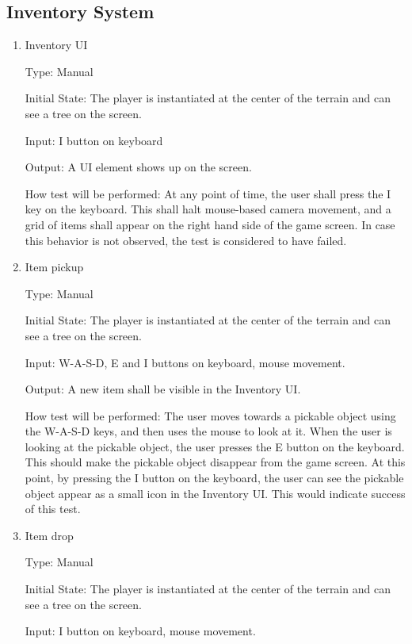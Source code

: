\documentclass[12pt, titlepage]{article}
\begin{document}
\subsection{Inventory System}

\begin{enumerate}
	
\item{Inventory UI\\}

Type: Manual

Initial State: The player is instantiated at the center of the terrain and can see a tree on the screen.

Input: I button on keyboard

Output: A UI element shows up on the screen.

How test will be performed:
At any point of time, the user shall press the I key on the keyboard. This shall halt mouse-based camera movement, and a grid of items shall appear on the right hand side of the game screen. In case this behavior is not observed, the test is considered to have failed.

\item{Item pickup\\}

Type: Manual

Initial State: The player is instantiated at the center of the terrain and can see a tree on the screen.

Input: W-A-S-D, E and I buttons on keyboard, mouse movement.

Output: A new item shall be visible in the Inventory UI.

How test will be performed:
The user moves towards a pickable object using the W-A-S-D keys, and then uses the mouse to look at it. When the user is looking at the pickable object, the user presses the E button on the keyboard. This should make the pickable object disappear from the game screen. At this point, by pressing the I button on the keyboard, the user can see the pickable object appear as a small icon in the Inventory UI. This would indicate success of this test.

\item{Item drop\\}

Type: Manual

Initial State: The player is instantiated at the center of the terrain and can see a tree on the screen.

Input: I button on keyboard, mouse movement.


\end{enumerate}
\end{document}
